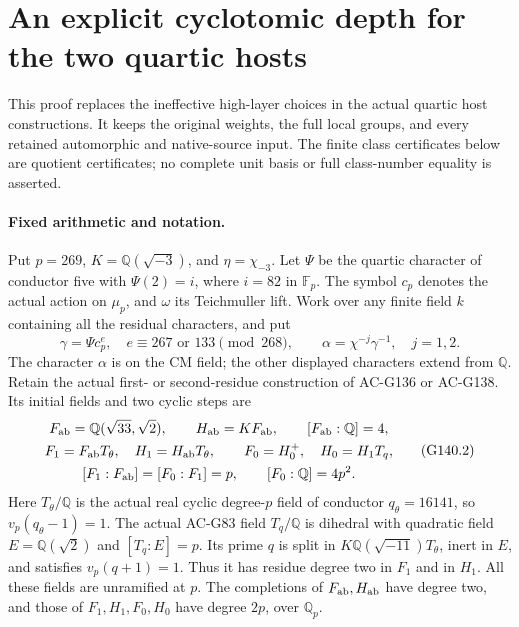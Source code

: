 \section{An explicit cyclotomic depth for the two quartic hosts}
\label{sec:cubic-effective-host-depth}

This proof replaces the ineffective high-layer choices in the actual
quartic host constructions.  It keeps the original weights, the full
local groups, and every retained automorphic and native-source input.
The finite class certificates below are quotient certificates; no
complete unit basis or full class-number equality is asserted.

\paragraph{Fixed arithmetic and notation.}
Put $p=269$, $K=\mathbb Q(\sqrt{-3})$, and $\eta=\chi_{-3}$.
Let $\Psi$ be the quartic character of conductor five with
$\Psi(2)=i$, where $i=82$ in $\mathbb F_p$.
The symbol $c_p$ denotes the actual action on $\mu_p$, and $\omega$
its Teichmuller lift.  Work over any finite field $k$ containing all
the residual characters, and put
\[
 \gamma=\Psi c_p^e,\quad e\equiv267\text{ or }133\pmod{268},
 \qquad \alpha=\chi^{-j}\gamma^{-1},\quad j=1,2.
 \tag{G140.1}
\]
The character $\alpha$ is on the CM field; the other displayed
characters extend from $\mathbb Q$.  Retain the actual first- or
second-residue construction of AC-G136 or AC-G138.  Its initial fields
and two cyclic steps are
\[
 \begin{gathered}
 F_{\rm ab}=\mathbb Q(\sqrt{33},\sqrt2),\qquad
 H_{\rm ab}=KF_{\rm ab},\qquad [F_{\rm ab}:\mathbb Q]=4,\\
 F_1=F_{\rm ab}T_\theta,\quad H_1=H_{\rm ab}T_\theta,
 \qquad F_0=H_0^+,\quad H_0=H_1T_q,\\
 [F_1:F_{\rm ab}]=[F_0:F_1]=p,
 \qquad [F_0:\mathbb Q]=4p^2.
 \end{gathered} \tag{G140.2}
\]
Here $T_\theta/\mathbb Q$ is the actual real cyclic degree-$p$
field of conductor $q_\theta=16141$, so $v_p(q_\theta-1)=1$.
The actual AC-G83 field $T_q/\mathbb Q$ is dihedral with quadratic
field $E=\mathbb Q(\sqrt2)$ and $[T_q:E]=p$.
Its prime $q$ is split in $K\mathbb Q(\sqrt{-11})T_\theta$,
inert in $E$, and satisfies $v_p(q+1)=1$.
Thus it has residue degree two in $F_1$ and in $H_1$.
All these fields are unramified at $p$.  The completions of
$F_{\rm ab},H_{\rm ab}$ have degree two, and those of
$F_1,H_1,F_0,H_0$ have degree $2p$, over $\mathbb Q_p$.

